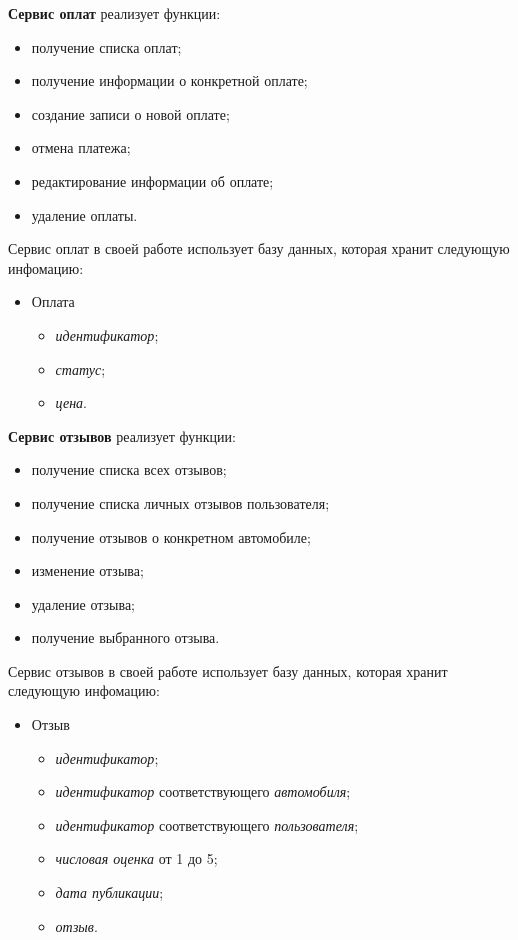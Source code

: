 \textbf{Сервис оплат} реализует функции:
\begin{itemize}
	\item получение списка оплат;
	
	\item получение информации о конкретной оплате;
	
	\item создание записи о новой оплате;
	
	\item отмена платежа;
	
	\item редактирование информации об оплате;
	
	\item удаление оплаты.
\end{itemize}

Сервис оплат в своей работе использует базу данных, которая хранит следующую инфомацию:

\begin{itemize}
	\item Оплата
	\begin{itemize}
		\item \textit{идентификатор};
		\item \textit{статус};
		\item \textit{цена}.
	\end{itemize}
\end{itemize}

\textbf{Сервис отзывов} реализует функции:
\begin{itemize}
	\item получение списка всех отзывов;
	\item получение списка личных отзывов пользователя;
	\item получение отзывов о конкретном автомобиле;
	\item изменение отзыва;
	\item удаление отзыва;
	\item получение выбранного отзыва.
\end{itemize}

Сервис отзывов в своей работе использует базу данных, которая хранит следующую инфомацию:

\begin{itemize}
	\item Отзыв
	\begin{itemize}
		\item \textit{идентификатор};
		\item \textit{идентификатор} соответствующего \textit{автомобиля};
		\item \textit{идентификатор} соответствующего \textit{пользователя};
		\item \textit{числовая оценка} от 1 до 5;
		\item \textit{дата публикации};
		\item \textit{отзыв}.
	\end{itemize}
\end{itemize}

